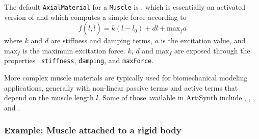 The default {\tt AxialMaterial} for a {\tt Muscle} is
,
which is essentially an activated version of 
and 
which computes a simple force according to
%
\begin{equation}
f(l, \dot l) = k (l-l_0) + d \dot l + \text{max}_f a
\end{equation}
%
where $k$ and $d$ are stiffness and damping terms, $a$ is the
excitation value, and $\text{max}_f$ is the maximum excitation force.
$k$, $d$ and $\text{max}_f$ are exposed through the properties {\tt
stiffness}, {\tt damping}, and {\tt maxForce}.

More complex muscle materials are typically used for biomechanical
modeling applications, generally with non-linear passive terms and
active terms that depend on the muscle length $l$.  Some of those
available in ArtiSynth include
,
,
, and
.


\subsubsection{Example: Muscle attached to a rigid body}
\label{SimpleMuscleExample:sec}

